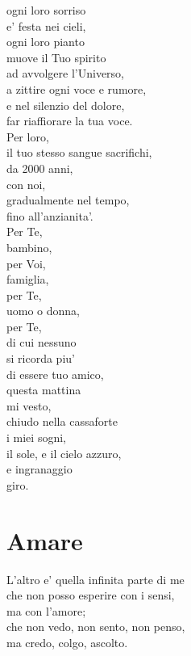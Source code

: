 \begin{haiku}
ogni loro sorriso\\
e' festa nei cieli,\\
ogni loro pianto\\
muove il Tuo spirito\\
ad avvolgere l'Universo,\\
a zittire ogni voce e rumore,\\
e nel silenzio del dolore,\\
far riaffiorare la tua voce.\\
Per loro,\\
il tuo stesso sangue sacrifichi, \\
da 2000 anni,\\
con noi,\\
gradualmente nel tempo,\\
fino all'anzianita'.\\
Per Te,\\
bambino,\\
per Voi,\\
famiglia,\\
per Te,\\
uomo o donna,\\
per Te,\\
di cui nessuno\\
si ricorda piu'\\
di essere tuo amico,\\
questa mattina\\
mi vesto,\\
chiudo nella cassaforte\\
i miei sogni,\\
il sole, e il cielo azzuro,\\
e ingranaggio\\
giro.\\
\end{haiku}



\section{Amare}



\begin{haiku}
	L'altro e' quella infinita parte di me\\
	che non posso esperire con i sensi,\\
	ma con l'amore;\\
	che non vedo, non sento, non penso,\\
	ma credo, colgo, ascolto.\\
\end{haiku}


